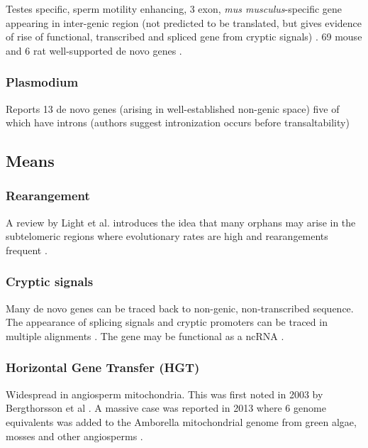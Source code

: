     Testes specific, sperm motility enhancing, 3 exon, \textit{mus
    musculus}-specific gene appearing in inter-genic region (not predicted
    to be translated, but gives evidence of rise of functional, transcribed
    and spliced gene from cryptic signals) \cite{heinen_emergence_2009}. 69
    mouse and 6 rat well-supported de novo genes \cite{murphy_novo_2012}.

\subsubsection{Plasmodium}

    Reports 13 de novo genes (arising in well-established non-genic space)
    five of which have introns (authors suggest intronization occurs before
    transaltability) \cite{yang_novo_2011}

\subsection{Means}

\subsubsection{Rearangement}

A review by Light et al. introduces the idea that many orphans may arise in the
subtelomeric regions where evolutionary rates are high and rearangements
frequent \cite{light_orphans_2014}.


\subsubsection{Cryptic signals} 

    Many de novo genes can be traced back to non-genic, non-transcribed
    sequence. The appearance of splicing signals and cryptic promoters can
    be traced in multiple alignments \cite{heinen_emergence_2009,
    yang_novo_2011, knowles_recent_2009}. The gene may be functional as a
    ncRNA \cite{heinen_emergence_2009}.

\subsubsection{Horizontal Gene Transfer (HGT)}

    Widespread in angiosperm mitochondria. This was first noted in 2003 by
    Bergthorsson et al \cite{bergthorsson_widespread_2003}. A massive case was
    reported in 2013 where 6 genome equivalents was added to the Amborella
    mitochondrial genome from green algae, mosses and other angiosperms
    \cite{rice_horizontal_2013}.

